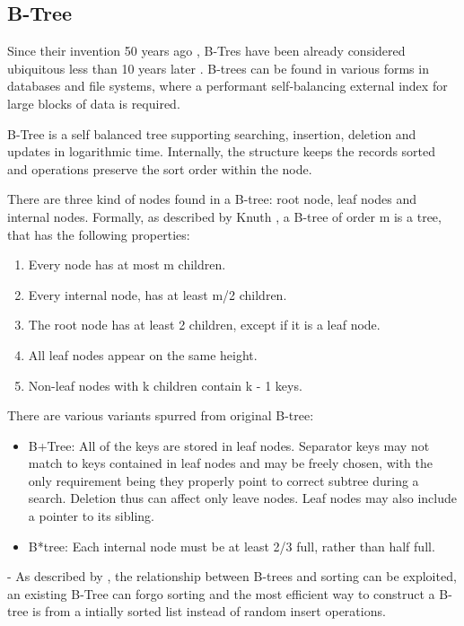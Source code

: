 \documentclass{article}
\begin{document}
\subsection{B-Tree}
Since their invention 50 years ago \cite{bayer-org}, B-Tres have been already considered ubiquitous less than 10 years later \cite{10.1145/356770.356776}. B-trees can be found in various forms in databases and file systems, where a performant self-balancing external index for large blocks of data is required.

B-Tree is a self balanced tree supporting searching, insertion, deletion and updates in logarithmic time. Internally, the structure keeps the records sorted and operations preserve the sort order within the node.

There are three kind of nodes found in a B-tree: root node, leaf nodes and internal nodes. Formally, as described by Knuth \cite{knuth1998art}, a B-tree of order m is a tree, that has the following properties:

\begin{enumerate}
    \item Every node has at most m children.
    \item Every internal node, has at least m/2 children.
    \item The root node has at least 2 children, except if it is a leaf node.
    \item All leaf nodes appear on the same height.
    \item Non-leaf nodes with k children contain k - 1 keys.
\end{enumerate}

There are various variants spurred from original B-tree:

\begin{itemize}
    \item B+Tree: All of the keys are stored in leaf nodes. Separator keys may not match to keys contained in leaf nodes and may be freely chosen, with the only requirement being they properly point to correct subtree during a search. Deletion thus can affect only leave nodes. Leaf nodes may also include a pointer to its sibling.
    \item B*tree: Each internal node must be at least 2/3 full, rather than half full.
\end{itemize}


- As described by \cite{goetz-text}, the relationship between B-trees and sorting can be exploited, an existing B-Tree can forgo sorting and the most efficient way to construct a B-tree is from a intially sorted list instead of random insert operations.
\end{document}
